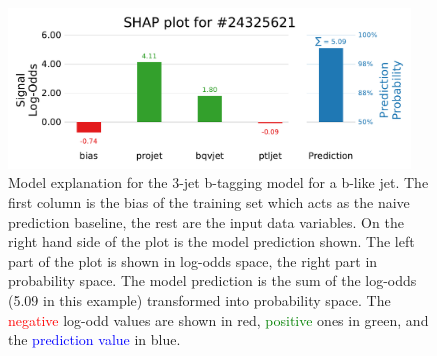 \documentclass[a4paper, twoside, nobib]{tufte-book}
\begin{document}
\begin{figure}
  \includegraphics[width=0.95\textwidth, trim=0 0 0 40, clip]{figures/quarks/shap_values-down_sample=1.00-ML_vars=vertex-selection=b-ejet_min=4-n_iter_RS_lgb=99-n_iter_RS_xgb=9-cdot_cut=0.90-version=19-njet=3loc=24325621.pdf}
  \caption[SHAP Prediction Explanation for b-like jet]
          {Model explanation for the 3-jet b-tagging model for a b-like jet. The first column is the bias of the training set which acts as the naive prediction baseline, the rest are the input data variables. On the right hand side of the plot is the model prediction shown. The left part of the plot is shown in log-odds space, the right part in probability space. The model prediction is the sum of the log-odds (5.09 in this example) transformed into probability space. The \textcolor{red}{negative} log-odd values are shown in red, \textcolor{green}{positive} ones in green, and the \textcolor{blue}{prediction value} in blue. 
          } 
  \label{fig:q:shap_signal}
\end{figure}
\end{document}
